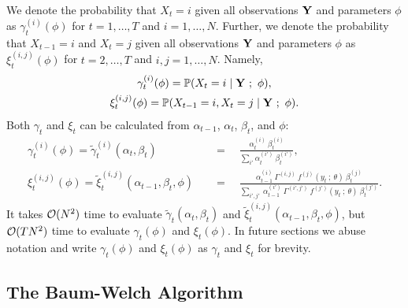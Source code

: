 We denote the probability that $X_t = i$ given all observations $\mathbf{Y}$ and parameters $\phi$ as $\gamma_t^{(i)}(\phi)$ for $t = 1,\ldots,T$ and $i = 1,\ldots,N$. Further, we denote the probability that $X_{t-1} = i$ and $X_t = j$ given all observations $\mathbf{Y}$ and parameters $\phi$ as $\xi_t^{(i,j)}(\phi)$ for $t = 2,\ldots,T$ and $i,j = 1,\ldots,N$. Namely,
%
\begin{gather}
    \gamma_t^{(i)}(\phi) = \mathbb{P}(X_t = i \mid \mathbf{Y} ~;~ \phi), \\ \xi_t^{(i,j)}(\phi) = \mathbb{P}(X_{t-1} = i, X_t = j \mid \mathbf{Y} ~;~ \phi).
\end{gather}
%
Both $\gamma_t$ and $\xi_t$ can be calculated from $\alpha_{t-1}$, $\alpha_t$, $\beta_t$, and $\phi$:
%
\begin{align}
    \gamma_t^{(i)}(\phi) = \tilde \gamma_{t}^{(i)}(\alpha_t,\beta_t) \quad &= \quad   \frac{\alpha_{t}^{(i)} ~ \beta_{t}^{(i)}}{\sum_{i'} \alpha_{t}^{(i')} ~ \beta_{t}^{(i')}}, \label{eqn:gamma} \\
    \xi_{t}^{(i,j)}(\phi) = \tilde \xi_{t}^{(i,j)}(\alpha_{t-1},\beta_{t},\phi) \quad &= \quad \frac{\alpha_{t-1}^{(i)} ~ \Gamma^{(i,j)} ~ f^{(j)}(y_{t} ~ ; ~\theta) ~ \beta_{t}^{(j)}}{\sum_{i',j'} ~ \alpha_{t-1}^{(i')} ~ \Gamma^{(i',j')} ~ f^{(j')}(y_{t} ~ ; ~\theta) ~ \beta_{t}^{(j')}} \label{eqn:xi}.
\end{align}
%
It takes $\mathcal{O}(N^2)$ time to evaluate $\tilde \gamma_{t}(\alpha_t,\beta_t)$ and $\tilde \xi_{t}^{(i,j)}(\alpha_{t-1},\beta_{t},\phi)$, but $\mathcal{O}(TN^2)$ time to evaluate $\gamma_t(\phi)$ and $\xi_t(\phi)$. In future sections we abuse notation and write $\gamma_t(\phi)$ and $\xi_t(\phi)$ as $\gamma_t$ and $\xi_t$ for brevity. 

\subsection{The Baum-Welch Algorithm}

